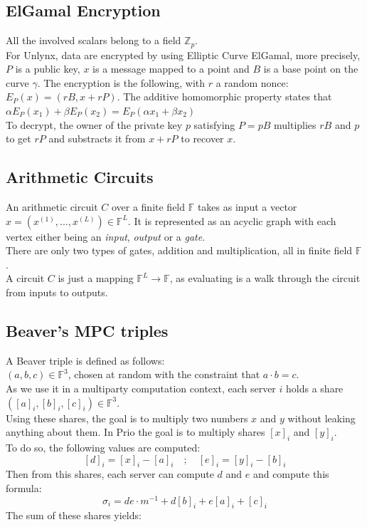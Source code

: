 \documentclass{article}
\begin{document}
\subsection*{ElGamal Encryption}
All the involved scalars belong to a field $\mathbb{Z}_p$.\\
For Unlynx, data are encrypted by using Elliptic Curve ElGamal, more precisely, $P$ is a public key, $x$ is a message mapped to a point and $B$ is a base point on the curve $\gamma$. The encryption is the following, with $r$ a random nonce:\\
$E_P(x) = (rB,x+rP)$. The additive homomorphic property states that $\alpha E_P(x_1) + \beta E_P(x_2) = E_P(\alpha x_1+ \beta x_2)$\\
To decrypt, the owner of the private key $p$ satisfying $P = pB$ multiplies $rB$ and $p$ to get $rP$ and substracts it from $x + rP$ to recover $x$.\\

\subsection*{Arithmetic Circuits}
An arithmetic circuit $C$ over a finite field $\mathbb{F}$ takes as input a vector $x = (x^{(1)},...,x^{(L)}) \in \mathbb{F}^L $. It is represented as an acyclic graph with each vertex either being an \textit{input}, \textit{output} or a \textit{gate}.\\
There are only two types of gates, addition and multiplication, all in finite field $\mathbb{F}$.\\
A circuit $C$ is just a mapping $\mathbb{F}^L \rightarrow \mathbb{F}$, as evaluating is a walk through the circuit from inputs to outputs.

\subsection*{Beaver's MPC triples}
A Beaver triple is defined as follows:\\
$(a,b,c) \in \mathbb{F}^3$, chosen at random with the constraint that $a \cdot b = c$.\\
As we use it in a multiparty computation context, each server $i$ holds a share $([a]_i , [b]_i , [c]_i) \in \mathbb{F}^3$.\\
Using these shares, the goal is to multiply two numbers $x$ and $y$ without leaking anything about them. In Prio the goal is to multiply shares $[x]_i$ and $[y]_i$.\\
To do so, the following values are computed:
$$[d]_i = [x]_i -[a]_i  \quad  ;  \quad  [e]_i = [y]_i - [b]_i$$ 
Then from this shares, each server can compute $d$ and $e$ and compute this formula:\\
$$\sigma_i = de \cdot m^{-1} + d[b]_i +e[a]_i + [c]_i$$
The sum of these shares yields:
\end{document}
